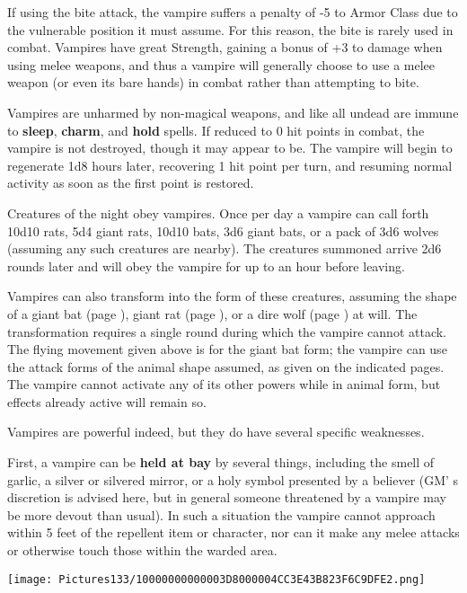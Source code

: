 \documentclass[a4paper,twoside,openany,10pt]{book}
\begin{document}
\begin{multicols}{2}
If using the bite attack, the vampire suffers a penalty of -5 to Armor Class due to the vulnerable position it must assume. For this reason, the bite is rarely used in combat. Vampires have great Strength, gaining a bonus of +3 to damage when using melee weapons, and thus a vampire will generally choose to use a melee weapon (or even its bare hands) in combat rather than attempting to bite.

Vampires are unharmed by non-magical weapons, and like all undead are immune to \textbf{sleep}, \textbf{charm},\textbf{ }and \textbf{hold }spells. If reduced to 0 hit points in combat, the vampire is not destroyed, though it may appear to be. The vampire will begin to regenerate 1d8 hours later, recovering 1 hit point per turn, and resuming normal activity as soon as the first point is restored.

Creatures of the night obey vampires. Once per day a vampire can call forth 10d10 rats, 5d4 giant rats, 10d10 bats, 3d6 giant bats, or a pack of 3d6 wolves (assuming any such creatures are nearby). The creatures summoned arrive 2d6 rounds later and will obey the vampire for up to an hour before leaving. 

Vampires can also transform into the form of these creatures, assuming the shape of a giant bat (page \hyperlink{bat-and-bat-giant}{\pageref{bat-and-bat-giant}}), giant rat (page \hyperlink{rat-and-rat-giant}{\pageref{rat-and-rat-giant}}), or a dire wolf (page \hyperlink{wolf-and-wolf-dire}{\pageref{wolf-and-wolf-dire}}) at will. The transformation requires a single round during which the vampire cannot attack. The flying movement given above is for the giant bat form; the vampire can use the attack forms of the animal shape assumed, as given on the indicated pages. The vampire cannot activate any of its other powers while in animal form, but effects already active will remain so. 

Vampires are powerful indeed, but they do have several specific weaknesses.

First, a vampire can be \textbf{held at bay} by several things, including the smell of garlic, a silver or silvered mirror, or a holy symbol presented by a believer (GM' s discretion is advised here, but in general someone threatened by a vampire may be more devout than usual). In such a situation the vampire cannot approach within 5 feet of the repellent item or character, nor can it make any melee attacks or otherwise touch those within the warded area. 

\begin{center} \texttt{[image: Pictures133/10000000000003D8000004CC3E43B823F6C9DFE2.png]} \end{center}


\end{multicols}
\end{document}
